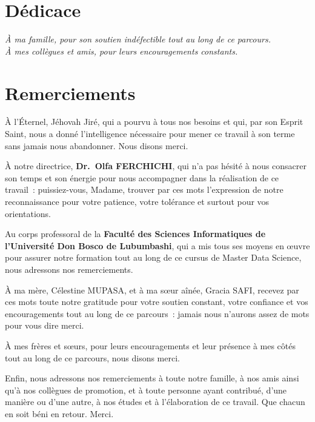 \documentclass[11pt,a4paper]{report}
\begin{document}
\chapter*{Dédicace}
\thispagestyle{empty}
\vspace*{5cm}
\begin{flushright}
    \textit{À ma famille, pour son soutien indéfectible tout au long de ce parcours.}\\[0.5cm]
    \textit{À mes collègues et amis, pour leurs encouragements constants.}\\[0.5cm]
\end{flushright}
\newpage

\chapter*{Remerciements}

À l'Éternel, Jéhovah Jiré, qui a pourvu à tous nos besoins et qui, par son Esprit Saint, nous a donné l'intelligence nécessaire pour mener ce travail à son terme sans jamais nous abandonner. Nous disons merci.

À notre directrice, \textbf{Dr.~Olfa FERCHICHI}, qui n'a pas hésité à nous consacrer son temps et son énergie pour nous accompagner dans la réalisation de ce travail~: puissiez-vous, Madame, trouver par ces mots l'expression de notre reconnaissance pour votre patience, votre tolérance et surtout pour vos orientations.

Au corps professoral de la \textbf{Faculté des Sciences Informatiques de l'Université Don Bosco de Lubumbashi}, qui a mis tous ses moyens en œuvre pour assurer notre formation tout au long de ce cursus de Master Data Science, nous adressons nos remerciements.

À ma mère, Célestine MUPASA, et à ma sœur aînée, Gracia SAFI, recevez par ces mots toute notre gratitude pour votre soutien constant, votre confiance et vos encouragements tout au long de ce parcours~: jamais nous n'aurons assez de mots pour vous dire merci.

À mes frères et sœurs, pour leurs encouragements et leur présence à mes côtés tout au long de ce parcours, nous disons merci.

Enfin, nous adressons nos remerciements à toute notre famille, à nos amis ainsi qu'à nos collègues de promotion, et à toute personne ayant contribué, d'une manière ou d'une autre, à nos études et à l'élaboration de ce travail. Que chacun en soit béni en retour. Merci.
\end{document}

